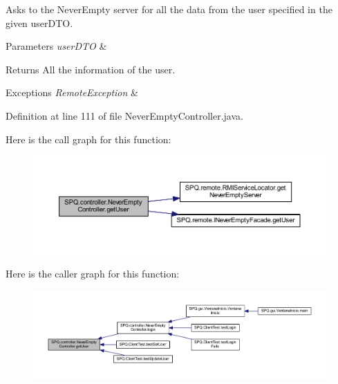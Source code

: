 Asks to the Never\+Empty server for all the data from the user specified in the given user\+D\+TO. 
\begin{DoxyParams}{Parameters}
{\em user\+D\+TO} & \\
\hline
\end{DoxyParams}
\begin{DoxyReturn}{Returns}
All the information of the user. 
\end{DoxyReturn}

\begin{DoxyExceptions}{Exceptions}
{\em Remote\+Exception} & \\
\hline
\end{DoxyExceptions}


Definition at line 111 of file Never\+Empty\+Controller.\+java.

Here is the call graph for this function\+:\nopagebreak
\begin{figure}[H]
\begin{center}
\leavevmode
\includegraphics[width=350pt]{class_s_p_q_1_1controller_1_1_never_empty_controller_a4f799c7fc9ce32740ec45401fa6fd1b1_cgraph}
\end{center}
\end{figure}
Here is the caller graph for this function\+:\nopagebreak
\begin{figure}[H]
\begin{center}
\leavevmode
\includegraphics[width=350pt]{class_s_p_q_1_1controller_1_1_never_empty_controller_a4f799c7fc9ce32740ec45401fa6fd1b1_icgraph}
\end{center}
\end{figure}
\mbox{\label{class_s_p_q_1_1controller_1_1_never_empty_controller_ac6b9878caf6a1f22117adf18c5ca56b5}} 
